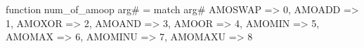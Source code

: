 function num_of_amoop arg# = match arg# {
  AMOSWAP => 0,
  AMOADD => 1,
  AMOXOR => 2,
  AMOAND => 3,
  AMOOR => 4,
  AMOMIN => 5,
  AMOMAX => 6,
  AMOMINU => 7,
  AMOMAXU => 8
}
